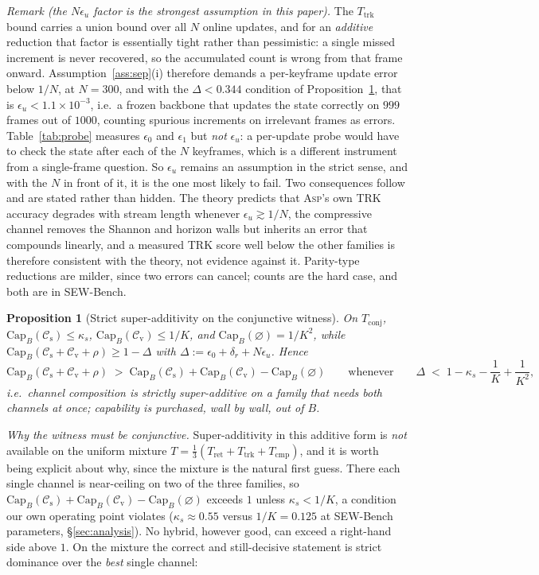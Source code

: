 \documentclass[10pt]{article}
\newtheorem{proposition}{Proposition}
\theoremstyle{definition}
\theoremstyle{plain}
\newcommand{\ASP}{\textsc{Asp}}
\renewcommand{\Cap}{\mathrm{Cap}}
\newcommand{\cs}{\mathcal{C}_{\mathrm{s}}}
\newcommand{\cv}{\mathcal{C}_{\mathrm{v}}}
\begin{document}
\emph{Remark (the $N\epsilon_u$ factor is the strongest assumption in this paper).} The $T_{\mathrm{trk}}$ bound carries a union bound over all $N$ online updates, and for an \emph{additive} reduction that factor is essentially tight rather than pessimistic: a single missed increment is never recovered, so the accumulated count is wrong from that frame onward. Assumption~\ref{ass:sep}(i) therefore demands a per-keyframe update error below $1/N$, at $N{=}300$, and with the $\Delta<0.344$ condition of Proposition~\ref{prop:super}, that is $\epsilon_u<1.1\times10^{-3}$, i.e.\ a frozen backbone that updates the state correctly on $999$ frames out of $1000$, counting spurious increments on irrelevant frames as errors. Table~\ref{tab:probe} measures $\epsilon_0$ and $\epsilon_1$ but \emph{not} $\epsilon_u$: a per-update probe would have to check the state after each of the $N$ keyframes, which is a different instrument from a single-frame question. So $\epsilon_u$ remains an assumption in the strict sense, and with the $N$ in front of it, it is the one most likely to fail. Two consequences follow and are stated rather than hidden. The theory predicts that \ASP{}'s own TRK accuracy degrades with stream length whenever $\epsilon_u\gtrsim1/N$, the compressive channel removes the Shannon and horizon walls but inherits an error that compounds linearly, and a measured TRK score well below the other families is therefore consistent with the theory, not evidence against it. Parity-type reductions are milder, since two errors can cancel; counts are the hard case, and both are in SEW-Bench.

\begin{proposition}[Strict super-additivity on the conjunctive witness]
\label{prop:super}
On $T_{\mathrm{conj}}$, $\Cap_B(\cs)\le\kappa_s$, $\Cap_B(\cv)\le 1/K$, and $\Cap_B(\varnothing)=1/K^2$, while
$\Cap_B(\cs{+}\cv{+}\rho)\ge 1-\Delta$ with $\Delta:=\epsilon_0+\delta_r+N\epsilon_u$. Hence
\[
\Cap_B(\cs{+}\cv{+}\rho)\;>\;\Cap_B(\cs)+\Cap_B(\cv)-\Cap_B(\varnothing)
\qquad\text{whenever}\qquad
\Delta\;<\;1-\kappa_s-\frac1K+\frac1{K^2},
\]
i.e.\ channel composition is strictly super-additive on a family that needs both channels at once; capability is \emph{purchased}, wall by wall, out of $B$.
\end{proposition}

\emph{Why the witness must be conjunctive.} Super-additivity in this additive form is \emph{not} available on the uniform mixture $T=\tfrac13(T_{\mathrm{ret}}+T_{\mathrm{trk}}+T_{\mathrm{cmp}})$, and it is worth being explicit about why, since the mixture is the natural first guess. There each single channel is near-ceiling on two of the three families, so $\Cap_B(\cs)+\Cap_B(\cv)-\Cap_B(\varnothing)$ exceeds $1$ unless $\kappa_s<1/K$, a condition our own operating point violates ($\kappa_s\approx0.55$ versus $1/K=0.125$ at SEW-Bench parameters, \S\ref{sec:analysis}). No hybrid, however good, can exceed a right-hand side above $1$. On the mixture the correct and still-decisive statement is strict dominance over the \emph{best} single channel:
\end{document}
